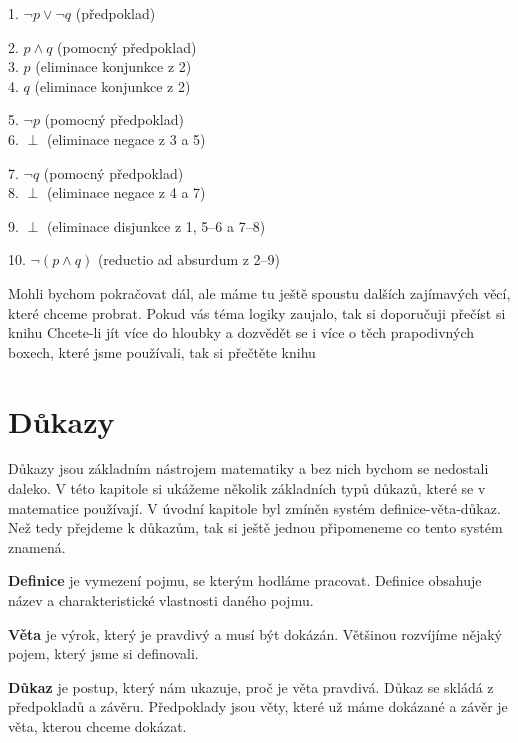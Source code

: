 \begin{example}
  \begin{proofbox}

    1. $\neg p \lor \neg q$ (předpoklad)
    \begin{proofbox}
      2. $p \land q$ (pomocný předpoklad) \\
      3. $p$ (eliminace konjunkce z 2) \\
      4. $q$ (eliminace konjunkce z 2)
      \begin{proofbox}
        5. $\neg p$ (pomocný předpoklad) \\
        6. $\perp$ (eliminace negace z 3 a 5)
      \end{proofbox}
      \begin{proofbox}
        7. $\neg q$ (pomocný předpoklad) \\
        8. $\perp$ (eliminace negace z 4 a 7)
      \end{proofbox}
      9. $\perp$ (eliminace disjunkce z 1, 5--6 a 7--8)
    \end{proofbox}
    10. $\neg(p \land q)$ (reductio ad absurdum z 2--9)
  \end{proofbox}

\end{example}

Mohli bychom pokračovat dál, ale máme tu ještě spoustu dalších zajímavých věcí, které chceme probrat. Pokud vás téma logiky zaujalo, tak si doporučuji přečíst si knihu 
Chcete-li jít více do hloubky a dozvědět se i více o těch prapodivných boxech, které jsme používali, tak si přečtěte knihu
\section{Důkazy}
Důkazy jsou základním nástrojem matematiky a bez nich bychom se nedostali daleko. V této kapitole si ukážeme několik základních typů důkazů, které se v matematice používají. V úvodní kapitole byl zmíněn systém definice-věta-důkaz. Než tedy přejdeme k důkazům, tak si ještě jednou připomeneme co tento systém znamená.

\begin{definitionbox}
  \textbf{Definice} je vymezení pojmu, se kterým hodláme pracovat. Definice obsahuje název a charakteristické vlastnosti daného pojmu.

  \textbf{Věta} je výrok, který je pravdivý a musí být dokázán. Většinou rozvíjíme nějaký pojem, který jsme si definovali.

  \textbf{Důkaz} je postup, který nám ukazuje, proč je věta pravdivá. Důkaz se skládá z předpokladů a závěru. Předpoklady jsou věty, které už máme dokázané a závěr je věta, kterou chceme dokázat.
\end{definitionbox}

